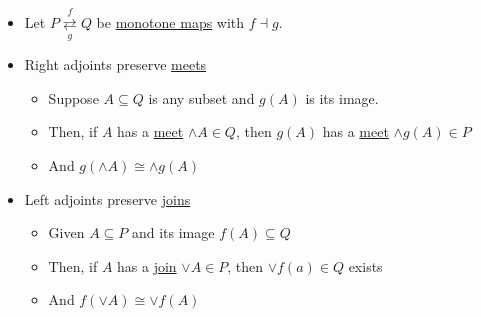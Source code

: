 
\begin{itemize}
    \item Let $P \overset{f}{\underset{g}{\rightleftarrows}} Q$ be \href{doc/1 math/Seven Sketches in Compositionality/Chapter 1: Generative Effects/4 Monotone maps/1 Monotone map}{monotone maps} with $f \dashv g$.
    \item Right adjoints preserve \href{doc/1 math/Seven Sketches in Compositionality/Chapter 1: Generative Effects/5 Meets and joins/1 Definition and basic examples/Meet and join}{meets}
          \begin{itemize}
            \item Suppose $A \subseteq Q$ is any subset and $g(A)$ is its image.
            \item Then, if $A$ has a \href{doc/1 math/Seven Sketches in Compositionality/Chapter 1: Generative Effects/5 Meets and joins/1 Definition and basic examples/Meet and join}{meet} $\wedge A \in Q$, then $g(A)$ has a \href{doc/1 math/Seven Sketches in Compositionality/Chapter 1: Generative Effects/5 Meets and joins/1 Definition and basic examples/Meet and join}{meet} $\wedge g(A) \in P$
            \item And $g(\wedge A) \cong \wedge g(A)$
          \end{itemize}
    \item Left adjoints preserve \href{doc/1 math/Seven Sketches in Compositionality/Chapter 1: Generative Effects/5 Meets and joins/1 Definition and basic examples/Meet and join}{joins}
          \begin{itemize}
            \item Given $A \subseteq P$ and its image $f(A) \subseteq Q$
            \item Then, if $A$ has a \href{doc/1 math/Seven Sketches in Compositionality/Chapter 1: Generative Effects/5 Meets and joins/1 Definition and basic examples/Meet and join}{join} $\vee A \in P$, then $\vee f(a) \in Q$ exists
            \item And $f(\vee A) \cong \vee f(A)$     \end{itemize}
  \end{itemize}
